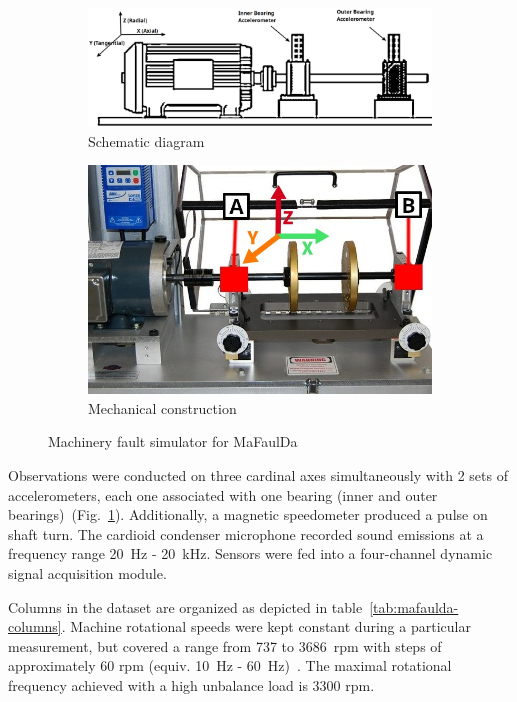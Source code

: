 \begin{figure}[h]
\centering
\begin{subfigure}[b]{0.48\textwidth}
	\includegraphics[width=\textwidth]{assets/analysis/mafaulda-simulator.png}
	\caption{Schematic diagram \cite{pestana-viana_influence_2016}}
\end{subfigure}
\hfill
\begin{subfigure}[b]{0.48\textwidth}
	\includegraphics[width=\textwidth]{assets/design/sensor/mafaulda-simulator.jpg}
	\caption{Mechanical construction \cite{noauthor_spectraquest_nodate}}
\end{subfigure}
\caption{Machinery fault simulator for MaFaulDa}
\label{fig:mafaulda-simulator}
\end{figure}

Observations were conducted on three cardinal axes simultaneously with 2 sets of accelerometers, each one associated with one bearing (inner and outer bearings)~(Fig.~\ref{fig:mafaulda-simulator}). Additionally, a magnetic speedometer produced a pulse on shaft turn. The cardioid condenser microphone recorded sound emissions at a frequency range 20~Hz - 20~kHz. Sensors were fed into a four-channel dynamic signal acquisition module. 

Columns in the dataset are organized as depicted in table~\ref{tab:mafaulda-columns}. Machine rotational speeds were kept constant during a particular measurement, but covered a range from 737 to 3686~rpm with steps of approximately 60 rpm (equiv. 10~Hz - 60~Hz)~\cite{pestana-viana_influence_2016}. The maximal rotational frequency achieved with a high unbalance load is 3300 rpm.

